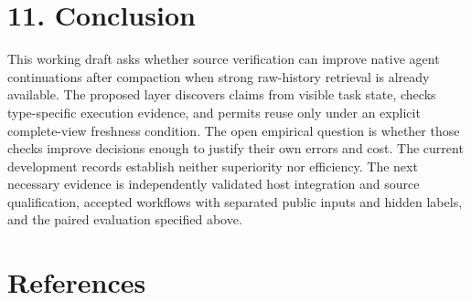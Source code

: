 \documentclass[
  11pt,
  a4paper,
]{article}
\begin{document}
\section{11. Conclusion}\label{conclusion}

This working draft asks whether source verification can improve native
agent continuations after compaction when strong raw-history retrieval
is already available. The proposed layer discovers claims from visible
task state, checks type-specific execution evidence, and permits reuse
only under an explicit complete-view freshness condition. The open
empirical question is whether those checks improve decisions enough to
justify their own errors and cost. The current development records
establish neither superiority nor efficiency. The next necessary
evidence is independently validated host integration and source
qualification, accepted workflows with separated public inputs and
hidden labels, and the paired evaluation specified above.

\clearpage

\section{References}\label{references}
\end{document}
